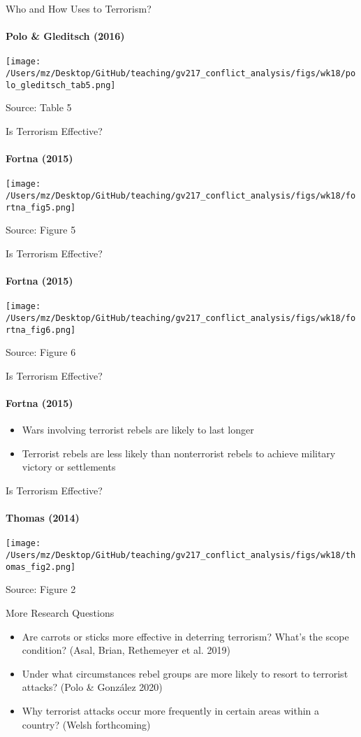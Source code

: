 \documentclass[handout]{beamer}
\begin{document}
\begin{frame}{Who and How Uses to Terrorism?}
\framesubtitle{Polo \& Gleditsch (2016)}
    \begin{center}
        \texttt{[image: /Users/mz/Desktop/GitHub/teaching/gv217\_conflict\_analysis/figs/wk18/polo\_gleditsch\_tab5.png]}
    \end{center}
    \footnotesize Source: Table 5
\end{frame}

\begin{frame}{Is Terrorism Effective?}
\framesubtitle{Fortna (2015)}
    \begin{center}
        \texttt{[image: /Users/mz/Desktop/GitHub/teaching/gv217\_conflict\_analysis/figs/wk18/fortna\_fig5.png]}
    \end{center}
    \footnotesize Source: Figure 5
\end{frame}

\begin{frame}{Is Terrorism Effective?}
\framesubtitle{Fortna (2015)}
    \begin{center}
        \texttt{[image: /Users/mz/Desktop/GitHub/teaching/gv217\_conflict\_analysis/figs/wk18/fortna\_fig6.png]}
    \end{center}
    \footnotesize Source: Figure 6
\end{frame}

\begin{frame}{Is Terrorism Effective?}
\framesubtitle{Fortna (2015)}
    \begin{itemize}
        \pause\item Wars involving terrorist rebels are likely to last longer
        \pause\item Terrorist rebels are less likely than nonterrorist rebels to achieve military victory or settlements
    \end{itemize}
\end{frame}

\begin{frame}{Is Terrorism Effective?}
\framesubtitle{Thomas (2014)}
    \begin{center}
        \texttt{[image: /Users/mz/Desktop/GitHub/teaching/gv217\_conflict\_analysis/figs/wk18/thomas\_fig2.png]}
    \end{center}
    \footnotesize Source: Figure 2
\end{frame}

\begin{frame}{More Research Questions}
    \begin{itemize}
        \pause\item Are carrots or sticks more effective in deterring terrorism? What's the scope condition? (Asal, Brian, Rethemeyer et al. 2019)
        \pause\item Under what circumstances rebel groups are more likely to resort to terrorist attacks? (Polo \& González 2020)
        \pause\item Why terrorist attacks occur more frequently in certain areas within a country? (Welsh forthcoming)
    \end{itemize}
\end{frame}
\end{document}
